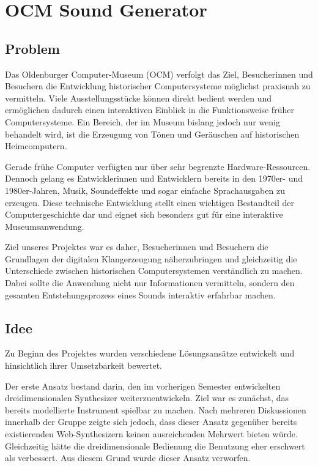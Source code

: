 \chapter{OCM Sound Generator}

\section{Problem}

Das Oldenburger Computer-Museum (OCM) verfolgt das Ziel, Besucherinnen und Besuchern
die Entwicklung historischer Computersysteme möglichst praxisnah zu vermitteln. Viele
Ausstellungsstücke können direkt bedient werden und ermöglichen dadurch einen
interaktiven Einblick in die Funktionsweise früher Computersysteme. Ein Bereich, der im
Museum bislang jedoch nur wenig behandelt wird, ist die Erzeugung von Tönen und
Geräuschen auf historischen Heimcomputern.

Gerade frühe Computer verfügten nur über sehr begrenzte Hardware-Ressourcen. Dennoch
gelang es Entwicklerinnen und Entwicklern bereits in den 1970er- und 1980er-Jahren,
Musik, Soundeffekte und sogar einfache Sprachausgaben zu erzeugen. Diese technische
Entwicklung stellt einen wichtigen Bestandteil der Computergeschichte dar und eignet sich
besonders gut für eine interaktive Museumsanwendung.

Ziel unseres Projektes war es daher, Besucherinnen und Besuchern die Grundlagen der
digitalen Klangerzeugung näherzubringen und gleichzeitig die Unterschiede zwischen
historischen Computersystemen verständlich zu machen. Dabei sollte die Anwendung nicht
nur Informationen vermitteln, sondern den gesamten Entstehungsprozess eines Sounds
interaktiv erfahrbar machen.

\section{Idee}

Zu Beginn des Projektes wurden verschiedene Lösungsansätze entwickelt und hinsichtlich
ihrer Umsetzbarkeit bewertet.

Der erste Ansatz bestand darin, den im vorherigen Semester entwickelten
dreidimensionalen Synthesizer weiterzuentwickeln. Ziel war es zunächst, das bereits
modellierte Instrument spielbar zu machen. Nach mehreren Diskussionen innerhalb der
Gruppe zeigte sich jedoch, dass dieser Ansatz gegenüber bereits existierenden
Web-Synthesizern keinen ausreichenden Mehrwert bieten würde. Gleichzeitig hätte die
dreidimensionale Bedienung die Benutzung eher erschwert als verbessert. Aus diesem
Grund wurde dieser Ansatz verworfen.

